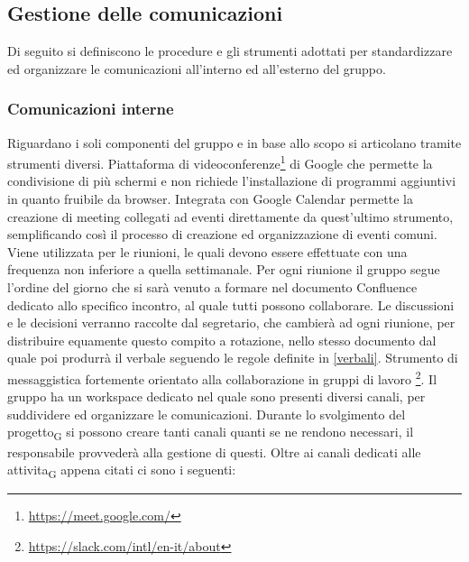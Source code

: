 \subsection{Gestione delle comunicazioni}
    Di seguito si definiscono le procedure e gli strumenti adottati per standardizzare ed organizzare le comunicazioni all'interno ed all'esterno del gruppo.
    \subsubsection{Comunicazioni interne}
        Riguardano i soli componenti del gruppo \group e in base allo scopo si articolano tramite strumenti diversi.
            Piattaforma di videoconferenze\footnote{\url{https://meet.google.com/}} di Google che permette la condivisione di più schermi e non richiede l'installazione di programmi aggiuntivi in quanto fruibile da browser. Integrata con Google Calendar permette la creazione di meeting collegati ad eventi direttamente da quest'ultimo strumento, semplificando così il processo di creazione ed organizzazione di eventi comuni.
            Viene utilizzata per le riunioni, le quali devono essere effettuate con una frequenza non inferiore a quella settimanale. Per ogni riunione il gruppo segue l'ordine del giorno che si sarà venuto a formare nel documento Confluence dedicato allo specifico incontro, al quale tutti possono collaborare. Le discussioni e le decisioni verranno raccolte dal segretario, che cambierà ad ogni riunione, per distribuire equamente questo compito a rotazione, nello stesso documento dal quale poi produrrà il verbale seguendo le regole definite in \ref{verbali}.
            Strumento di messaggistica fortemente orientato alla collaborazione in gruppi di lavoro \footnote{\url{https://slack.com/intl/en-it/about}}. Il gruppo \group ha un workspace dedicato nel quale sono presenti diversi canali, per suddividere ed organizzare le comunicazioni. Durante lo svolgimento del progetto\textsubscript{G} si possono creare tanti canali quanti se ne rendono necessari, il responsabile provvederà alla gestione di questi. Oltre ai canali dedicati alle attivita\textsubscript{G} appena citati ci sono i seguenti:
